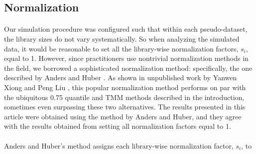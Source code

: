 \documentclass[10pt]{article}
\begin{document}
\subsection*{Normalization}
{\color{blue}
\paragraph{} \indent Our simulation procedure was configured such that within each pseudo-dataset, the library sizes do not vary systematically. So when analyzing the simulated data, it would be reasonable to set all the library-wise normalization factors, $s_i$, equal to 1. However, since practitioners use nontrivial normalization methods in the field, we borrowed a sophisticated normalization method: specifically, the one described by Anders and Huber \cite{deseq}. As shown in unpublished work by Yanwen Xiong and Peng Liu \cite{xiong}, this popular normalization method performs on par with the ubiquitous 0.75 quantile and TMM methods described in the introduction, sometimes even surpassing these two alternatives. The results presented in this article were obtained using the method by Anders and Huber, and they agree with the results obtained from setting all normalization factors equal to 1. }

\paragraph{} \indent Anders and Huber's method assigns each library-wise normalization factor, $s_i$, to
\end{document}
